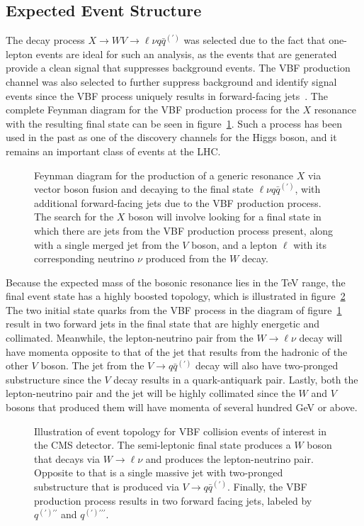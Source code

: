 \subsection{Expected Event Structure}

The decay process $X\to WV\to\ell\nu q\bar{q}^{(\prime)}$ was selected due to the fact that one-lepton events are ideal for such an analysis, as the events that are generated provide a clean signal that suppresses background events.
The VBF production channel was also selected to further suppress background and identify signal events since the VBF process uniquely results in forward-facing jets~\cite{rauch2016vectorboson}.
The complete Feynman diagram for the VBF production process for the $X$ resonance with the resulting final state can be seen in figure~\ref{fig:vbfFeynman}.
Such a process has been used in the past as one of the discovery channels for the Higgs boson, and it remains an important class of events at the LHC.

\begin{figure}[htbp]
  \centering
  
  \caption{
    Feynman diagram for the production of a generic resonance $X$ via vector boson fusion and decaying to the final state $\ell\nu q\bar{q}^{(\prime)}$, with additional forward-facing jets due to the VBF production process.
    The search for the $X$ boson will involve looking for a final state in which there are jets from the VBF production process present, along with a single merged jet from the $V$ boson, and a lepton $\ell$ with its corresponding neutrino $\nu$ produced from the $W$ decay.
  }
  \label{fig:vbfFeynman}
\end{figure}

Because the expected mass of the bosonic resonance lies in the TeV range, the final event state has a highly boosted topology, which is illustrated in figure~\ref{fig:eventTop}
The two initial state quarks from the VBF process in the diagram of figure~\ref{fig:vbfFeynman} result in two forward jets in the final state that are highly energetic and collimated.
Meanwhile, the lepton-neutrino pair from the $W\to\ell\nu$ decay will have momenta opposite to that of the jet that results from the hadronic of the other $V$ boson.
The jet from the $V\to q\bar{q}^{(\prime)}$ decay will also have two-pronged substructure since the $V$ decay results in a quark-antiquark pair.
Lastly, both the lepton-neutrino pair and the jet will be highly collimated since the $W$ and $V$ bosons that produced them will have momenta of several hundred GeV or above.

\begin{figure}[htbp]
  \centering
  
  \caption{
    Illustration of event topology for VBF collision events of interest in the CMS detector.
    The semi-leptonic final state produces a $W$ boson that decays via $W\to\ell\nu$ and produces the lepton-neutrino pair.
    Opposite to that is a single massive jet with two-pronged substructure that is produced via $V\to q\bar{q}^{(\prime)}$.
    Finally, the VBF production process results in two forward facing jets, labeled by $q^{(\prime)\prime\prime}$ and $q^{(\prime)\prime\prime\prime}$.
  }
  \label{fig:eventTop}
\end{figure}
